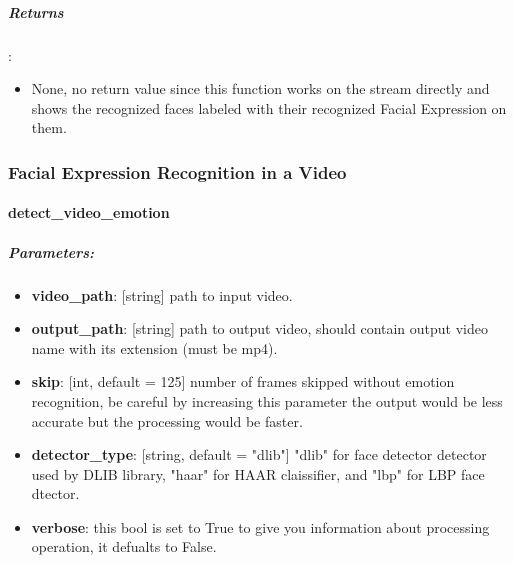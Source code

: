\subparagraph{Returns}:
\begin{changemargin}{0.5cm}{0cm}
\begin{itemize}[noitemsep,nolistsep]
	\item None, no return value since this function works on the stream directly and shows the recognized faces labeled with their recognized Facial Expression on them.
\end{itemize}
\end{changemargin}
	
\begin{comment}
\subparagraph{Usage}:
\begin{changemargin}{0.5cm}{0cm}
\begin{itemize}
	\item import the module:
	\begin{lstlisting}[language=Python]
	from Cerebro.interface Import video_stream as vs\end{lstlisting}
	\item call it:
	\begin{lstlisting}[language=Python]
	vs.detect_stream_emotions(skip)\end{lstlisting}
\end{itemize}
\end{changemargin}
\end{comment}



\subsubsection{Facial Expression Recognition in a Video}
\paragraph{detect\_video\_emotion}
\subparagraph{Parameters:}
\begin{changemargin}{0.5cm}{0cm} 
	\begin{itemize}
		\item  \textbf{video\_path}: [string] path to input video.
		\item  \textbf{output\_path}: [string] path to output video, should contain output video name with its extension (must be mp4).
		\item  \textbf{skip}: [int, default = 125] number of frames skipped without emotion recognition, be careful by increasing this parameter the output would be less accurate but the processing would be faster.
		\item \textbf{detector\_type}: [string, default = "dlib"] "dlib" for face detector detector used by DLIB library, "haar" for HAAR claissifier, and "lbp" for LBP face dtector.
		\item  \textbf{verbose}: this bool is set to True to give you information about processing operation, it defualts to False.
	\end{itemize}
\end{changemargin}

